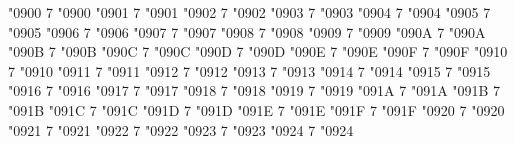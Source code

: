 \newcommand*{\chemtau}{\textrm{τ}}
\newcommand*{\chemupsilon}{\textrm{υ}}
\newcommand*{\chemphi}{\textrm{φ}}
\newcommand*{\chemchi}{\textrm{χ}}
\newcommand*{\chempsi}{\textrm{ψ}}
\newcommand*{\chemomega}{\textrm{ω}}
%
\newcommand*{\chemAlpha}{\textrm{Α}}
\newcommand*{\chemBeta}{\textrm{Β}}
\newcommand*{\chemGamma}{\textrm{Γ}}
\newcommand*{\chemDelta}{\textrm{Δ}}
\newcommand*{\chemEpsilon}{\textrm{Ε}}
\newcommand*{\chemZeta}{\textrm{Ζ}}
\newcommand*{\chemEta}{\textrm{Η}}
\newcommand*{\chemTheta}{\textrm{Θ}}
\newcommand*{\chemIota}{\textrm{Ι}}
\newcommand*{\chemKappa}{\textrm{Κ}}
\newcommand*{\chemLambda}{\textrm{Λ}}
\newcommand*{\chemMu}{\textrm{Μ}}
\newcommand*{\chemNu}{\textrm{Ν}}
\newcommand*{\chemXi}{\textrm{Ξ}}
\newcommand*{\chemOmicron}{\textrm{Ο}}
\newcommand*{\chemPi}{\textrm{Π}}
\newcommand*{\chemRho}{\textrm{Ρ}}
\newcommand*{\chemSigma}{\textrm{Σ}}
\newcommand*{\chemTau}{\textrm{Τ}}
\newcommand*{\chemUpsilon}{\textrm{Υ}}
\newcommand*{\chemPhi}{\textrm{Φ}}
\newcommand*{\chemChi}{\textrm{Χ}}
\newcommand*{\chemPsi}{\textrm{Ψ}}
\newcommand*{\chemOmega}{\textrm{Ω}}
%
\Umathcode "0900 7 \symoperators "0900%
\Umathcode "0901 7 \symoperators "0901%
\Umathcode "0902 7 \symoperators "0902%
\Umathcode "0903 7 \symoperators "0903%
\Umathcode "0904 7 \symoperators "0904%
\Umathcode "0905 7 \symoperators "0905%
\Umathcode "0906 7 \symoperators "0906%
\Umathcode "0907 7 \symoperators "0907%
\Umathcode "0908 7 \symoperators "0908%
\Umathcode "0909 7 \symoperators "0909%
\Umathcode "090A 7 \symoperators "090A%
\Umathcode "090B 7 \symoperators "090B%
\Umathcode "090C 7 \symoperators "090C%
\Umathcode "090D 7 \symoperators "090D%
\Umathcode "090E 7 \symoperators "090E%
\Umathcode "090F 7 \symoperators "090F%
%
\Umathcode "0910 7 \symoperators "0910%
\Umathcode "0911 7 \symoperators "0911%
\Umathcode "0912 7 \symoperators "0912%
\Umathcode "0913 7 \symoperators "0913%
\Umathcode "0914 7 \symoperators "0914%
\Umathcode "0915 7 \symoperators "0915%
\Umathcode "0916 7 \symoperators "0916%
\Umathcode "0917 7 \symoperators "0917%
\Umathcode "0918 7 \symoperators "0918%
\Umathcode "0919 7 \symoperators "0919%
\Umathcode "091A 7 \symoperators "091A%
\Umathcode "091B 7 \symoperators "091B%
\Umathcode "091C 7 \symoperators "091C%
\Umathcode "091D 7 \symoperators "091D%
\Umathcode "091E 7 \symoperators "091E%
\Umathcode "091F 7 \symoperators "091F%
%
\Umathcode "0920 7 \symoperators "0920%
\Umathcode "0921 7 \symoperators "0921%
\Umathcode "0922 7 \symoperators "0922%
\Umathcode "0923 7 \symoperators "0923%
\Umathcode "0924 7 \symoperators "0924%
